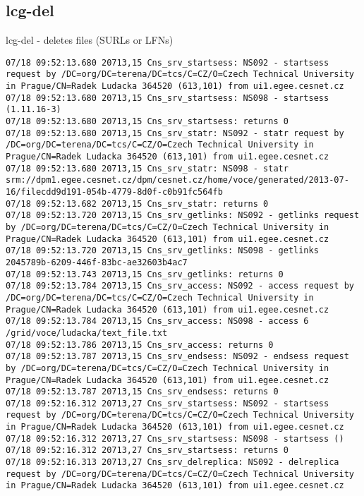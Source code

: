 \documentclass[a4paper, 11pt]{article} %
\begin{document}
\subsection{lcg-del}

lcg-del - deletes files (SURLs or LFNs)

\begin{lstlisting}[label={log:del1},caption={lcg-del --vo voce srm://dpm1.egee.cesnet.cz/dpm/cesnet.cz/home/voce/generated/2013-07-16/filecdd9d191-054b-4779-8d0f-c0b91fc564fb - delete only one replica}]
07/18 09:52:13.680 20713,15 Cns_srv_startsess: NS092 - startsess request by /DC=org/DC=terena/DC=tcs/C=CZ/O=Czech Technical University in Prague/CN=Radek Ludacka 364520 (613,101) from ui1.egee.cesnet.cz
07/18 09:52:13.680 20713,15 Cns_srv_startsess: NS098 - startsess (1.11.16-3)
07/18 09:52:13.680 20713,15 Cns_srv_startsess: returns 0
07/18 09:52:13.680 20713,15 Cns_srv_statr: NS092 - statr request by /DC=org/DC=terena/DC=tcs/C=CZ/O=Czech Technical University in Prague/CN=Radek Ludacka 364520 (613,101) from ui1.egee.cesnet.cz
07/18 09:52:13.680 20713,15 Cns_srv_statr: NS098 - statr srm://dpm1.egee.cesnet.cz/dpm/cesnet.cz/home/voce/generated/2013-07-16/filecdd9d191-054b-4779-8d0f-c0b91fc564fb
07/18 09:52:13.682 20713,15 Cns_srv_statr: returns 0
07/18 09:52:13.720 20713,15 Cns_srv_getlinks: NS092 - getlinks request by /DC=org/DC=terena/DC=tcs/C=CZ/O=Czech Technical University in Prague/CN=Radek Ludacka 364520 (613,101) from ui1.egee.cesnet.cz
07/18 09:52:13.720 20713,15 Cns_srv_getlinks: NS098 - getlinks  2045789b-6209-446f-83bc-ae32603b4ac7
07/18 09:52:13.743 20713,15 Cns_srv_getlinks: returns 0
07/18 09:52:13.784 20713,15 Cns_srv_access: NS092 - access request by /DC=org/DC=terena/DC=tcs/C=CZ/O=Czech Technical University in Prague/CN=Radek Ludacka 364520 (613,101) from ui1.egee.cesnet.cz
07/18 09:52:13.784 20713,15 Cns_srv_access: NS098 - access 6 /grid/voce/ludacka/text_file.txt
07/18 09:52:13.786 20713,15 Cns_srv_access: returns 0
07/18 09:52:13.787 20713,15 Cns_srv_endsess: NS092 - endsess request by /DC=org/DC=terena/DC=tcs/C=CZ/O=Czech Technical University in Prague/CN=Radek Ludacka 364520 (613,101) from ui1.egee.cesnet.cz
07/18 09:52:13.787 20713,15 Cns_srv_endsess: returns 0
07/18 09:52:16.312 20713,27 Cns_srv_startsess: NS092 - startsess request by /DC=org/DC=terena/DC=tcs/C=CZ/O=Czech Technical University in Prague/CN=Radek Ludacka 364520 (613,101) from ui1.egee.cesnet.cz
07/18 09:52:16.312 20713,27 Cns_srv_startsess: NS098 - startsess ()
07/18 09:52:16.312 20713,27 Cns_srv_startsess: returns 0
07/18 09:52:16.313 20713,27 Cns_srv_delreplica: NS092 - delreplica request by /DC=org/DC=terena/DC=tcs/C=CZ/O=Czech Technical University in Prague/CN=Radek Ludacka 364520 (613,101) from ui1.egee.cesnet.cz

\end{lstlisting}
\end{document}
